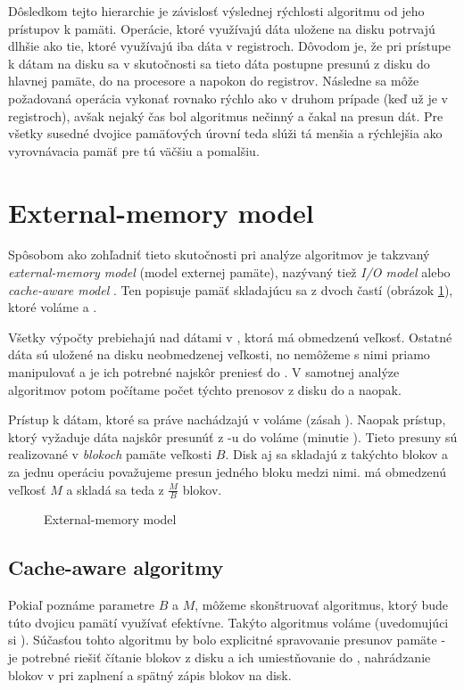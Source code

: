 
Dôsledkom tejto hierarchie je závislosť výslednej rýchlosti algoritmu od jeho prístupov k pamäti. Operácie, ktoré využívajú dáta uložene na disku potrvajú dlhšie ako tie, ktoré využívajú iba dáta v registroch. Dôvodom je, že pri prístupe k dátam na disku sa v skutočnosti sa tieto dáta postupne presunú z disku do hlavnej pamäte, do \cache na procesore a napokon do registrov. Následne sa môže požadovaná operácia vykonať rovnako rýchlo ako v druhom prípade (keď už je v registroch), avšak nejaký čas bol algoritmus nečinný a čakal na presun dát. Pre všetky susedné dvojice pamäťových úrovní teda slúži tá menšia a rýchlejšia ako vyrovnávacia pamäť pre tú väčšiu a pomalšiu. 

\section{External-memory model} \label{sec:extmem}
Spôsobom ako zohľadniť tieto skutočnosti pri analýze algoritmov je takzvaný \emph{external-memory model} (model externej pamäte), nazývaný tiež \emph{I/O model} alebo \emph{cache-aware model} \citep{aggarwal1988input}. Ten popisuje pamäť skladajúcu sa z dvoch častí (obrázok \ref{fig:exmem_model}), ktoré voláme \cache a \disk.

Všetky výpočty prebiehajú nad dátami v \cache, ktorá má obmedzenú veľkosť. Ostatné dáta sú uložené na disku neobmedzenej veľkosti, no nemôžeme s nimi priamo manipulovať a je ich potrebné najskôr preniesť do \cache. V samotnej analýze algoritmov potom počítame počet týchto prenosov z disku do \cache a naopak.

Prístup k dátam, ktoré sa práve nachádzajú v \cache voláme \hit (zásah \cache). Naopak prístup, ktorý vyžaduje dáta najskôr presunúť z \disk-u do \cache voláme \miss (minutie \cache). Tieto presuny sú realizované v \emph{blokoch} pamäte veľkosti $B$. Disk aj \cache sa skladajú z takýchto blokov a za jednu operáciu považujeme presun jedného bloku medzi nimi. \Cache má obmedzenú veľkosť $M$ a skladá sa teda z $\frac{M}{B}$ blokov.  

\begin{figure}
    \centering
    \resizebox{0.8\textwidth}{!}{%
            
    }
    \caption{External-memory model}
    \label{fig:exmem_model}
\end{figure}

\subsection{Cache-aware algoritmy}
Pokiaľ poznáme parametre $B$ a $M$, môžeme skonštruovať algoritmus, ktorý bude túto dvojicu pamätí využívať efektívne. Takýto algoritmus voláme \aware (uvedomujúci si \cache). Súčasťou tohto algoritmu by bolo explicitné spravovanie presunov pamäte - je potrebné riešiť čítanie blokov z disku a ich umiestňovanie do \cache, nahrádzanie blokov v \cache pri zaplnení a spätný zápis blokov na disk.

